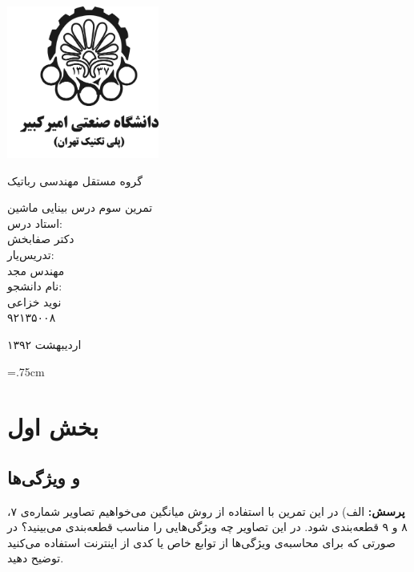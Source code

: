 \documentclass[12pt,a4paper]{article}
\theoremstyle{definition}
\theoremstyle{theorem}
\theoremstyle{definition}
\begin{document}
\thispagestyle{empty}
\vspace*{-28mm}
\centerline{\includegraphics[height=5cm]{logo.png}}
\begin{center}
\vspace{-2mm}
{\large \titr
گروه مستقل مهندسی رباتیک
\\[2.1cm]
}

{\Large \titr
تمرین سوم درس بینایی ماشین
\\[2cm]
استاد درس:
\\[.5cm]
دکتر صفابخش
\\[1.5cm]
\large 
تدریس‌یار: 
\\[0.5cm]
مهندس مجد
\\[1.5cm]
نام دانشجو:
\\[.5cm]
نوید خزاعی
\\[.5cm]
۹۲۱۳۵۰۰۸
\\[1.5cm]
}
\baselineskip=1cm

{\large
اردیبهشت ۱۳۹۲
}
\end{center}
\newpage
\baselineskip=1cm
\tableofcontents

\baselineskip=.75cm
\newpage 
\section{بخش اول}
\subsection{{ و ویژگی‌ها
}
}



\textbf{پرسش:}
الف) در این تمرین با استفاده از روش  میانگین می‌خواهیم تصاویر شماره‌ی ۷، ۸ و ۹ قطعه‌بندی شود. در این تصاویر چه ویژگی‌هایی را مناسب قطعه‌بندی می‌بینید؟ در صورتی که برای محاسبه‌ی ویژگی‌ها از توابع خاص یا کدی از اینترنت استفاده می‌کنید توضیح دهید.
\end{document}
